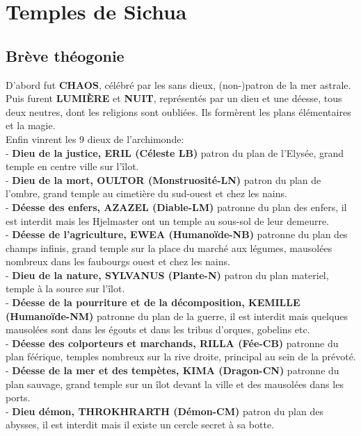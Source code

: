 \section{Temples de Sichua}

\subsection{Brève théogonie}
D'abord fut {\bf CHAOS}, célébré par les sans dieux, (non-)patron de la mer astrale. \\
Puis furent {\bf LUMIÈRE} et {\bf NUIT}, représentés par un dieu et une déesse, tous deux neutres, dont les religions sont oubliées. Ils formèrent les plans élémentaires et la magie.\\
Enfin vinrent les 9 dieux de l'archimonde: \\
- {\bf Dieu de la justice, ERIL (Céleste LB)} patron du plan de l'Elysée, grand temple en centre ville sur l'îlot. \\
- {\bf Dieu de la mort, OULTOR (Monstruosité-LN)} patron du plan de l'ombre, grand temple au cimetière du sud-ouest et chez les nains. \\
- {\bf Déesse des enfers, AZAZEL (Diable-LM)} patronne du plan des enfers, il est interdit mais les Hjelmaster ont un temple au sous-sol de leur demeurre. \\
- {\bf Déesse de l'agriculture, EWEA (Humanoïde-NB)} patronne du plan des champs infinis, grand temple sur la place du marché aux légumes, mausolées nombreux dans les faubourgs ouest et chez les nains. \\
- {\bf Dieu de la nature, SYLVANUS (Plante-N)} patron du plan materiel, temple à la source sur l'îlot. \\
- {\bf Déesse de la pourriture et de la décomposition, KEMILLE (Humanoïde-NM)} patronne du plan de la guerre, il est interdit mais quelques mausolées sont dans les égouts et dans les tribus d'orques, gobelins etc. \\
- {\bf Déesse des colporteurs et marchands, RILLA (Fée-CB)} patronne du plan féérique, temples nombreux sur la rive droite, principal au sein de la prévoté. \\
- {\bf Déesse de la mer et des tempètes, KIMA (Dragon-CN)} patronne du plan sauvage, grand temple sur un îlot devant la ville et des mausolées dans les ports. \\
- {\bf Dieu démon, THROKHRARTH (Démon-CM)} patron du plan des abysses, il est interdit mais il existe un cercle secret à sa botte. \\

